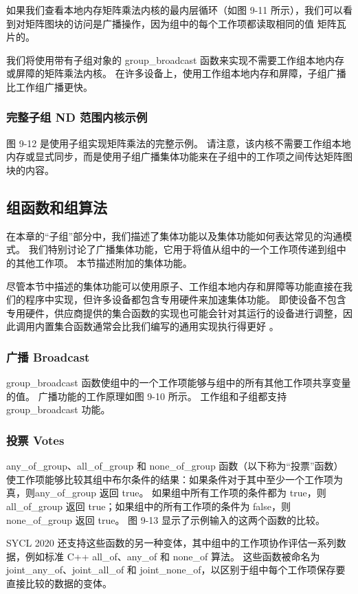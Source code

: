 如果我们查看本地内存矩阵乘法内核的最内层循环（如图 9-11 所示），我们可以看到对矩阵图块的访问是广播操作，因为组中的每个工作项都读取相同的值 矩阵瓦片的。

我们将使用带有子组对象的 group\_broadcast 函数来实现不需要工作组本地内存或屏障的矩阵乘法内核。 在许多设备上，使用工作组本地内存和屏障，子组广播比工作组广播更快。

\subsubsection{完整子组 ND 范围内核示例}
图 9-12 是使用子组实现矩阵乘法的完整示例。 请注意，该内核不需要工作组本地内存或显式同步，而是使用子组广播集体功能来在子组中的工作项之间传达矩阵图块的内容。

\subsection{组函数和组算法}
在本章的“子组”部分中，我们描述了集体功能以及集体功能如何表达常见的沟通模式。 我们特别讨论了广播集体功能，它用于将值从组中的一个工作项传递到组中的其他工作项。 本节描述附加的集体功能。

尽管本节中描述的集体功能可以使用原子、工作组本地内存和屏障等功能直接在我们的程序中实现，但许多设备都包含专用硬件来加速集体功能。 即使设备不包含专用硬件，供应商提供的集合函数的实现也可能会针对其运行的设备进行调整，因此调用内置集合函数通常会比我们编写的通用实现执行得更好 。

\subsubsection{广播 Broadcast}
group\_broadcast 函数使组中的一个工作项能够与组中的所有其他工作项共享变量的值。 广播功能的工作原理如图 9-10 所示。 工作组和子组都支持 group\_broadcast 功能。

\subsubsection{投票 Votes}
any\_of\_group、all\_of\_group 和 none\_of\_group 函数（以下称为“投票”函数）使工作项能够比较其组中布尔条件的结果：如果条件对于其中至少一个工作项为真，则any\_of\_group 返回 true。 如果组中所有工作项的条件都为 true，则 all\_of\_group 返回 true；如果组中的所有工作项的条件为 false，则 none\_of\_group 返回 true。 图 9-13 显示了示例输入的这两个函数的比较。

SYCL 2020 还支持这些函数的另一种变体，其中组中的工作项协作评估一系列数据，例如标准 C++ all\_of、any\_of 和 none\_of 算法。 这些函数被命名为 joint\_any\_of、joint\_all\_of 和 joint\_none\_of，以区别于组中每个工作项保存要直接比较的数据的变体。

